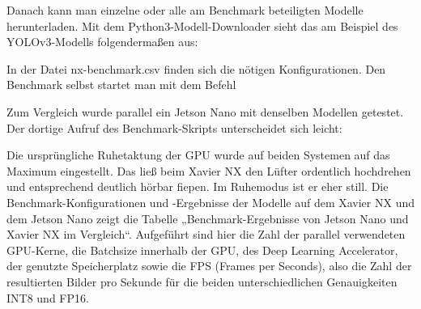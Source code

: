 Danach kann man einzelne oder alle am Benchmark beteiligten Modelle herunterladen. Mit dem Python3-Modell-Downloader sieht das am Beispiel des YOLOv3-­Modells folgendermaßen aus: 



In der Datei nx-benchmark.csv finden sich die nötigen Konfigurationen. Den Benchmark selbst startet man mit dem Befehl 



Zum Vergleich wurde parallel ein Jetson Nano mit denselben Modellen getestet. Der dortige Aufruf des Benchmark-Skripts unterscheidet sich leicht: 


Die ursprüngliche Ruhetaktung der GPU wurde auf beiden Systemen auf das Maximum eingestellt. Das ließ beim Xavier NX den Lüfter ordentlich hochdrehen und entsprechend deutlich hörbar fiepen. Im Ruhemodus ist er eher still. Die Benchmark-Konfigurationen und -Ergebnisse der Modelle auf dem Xavier NX und dem Jetson Nano zeigt die Tabelle „Benchmark-Ergebnisse von Jetson Nano und Xavier NX im Vergleich“. Aufgeführt sind hier die Zahl der parallel verwendeten GPU-Kerne, die Batch­size innerhalb der GPU, des Deep Learning Accelerator, der genutzte Speicherplatz sowie die FPS (Frames per ­Seconds), also die Zahl der resultierten Bilder pro Sekunde für die beiden unterschiedlichen Genauigkeiten INT8 und FP16. 


